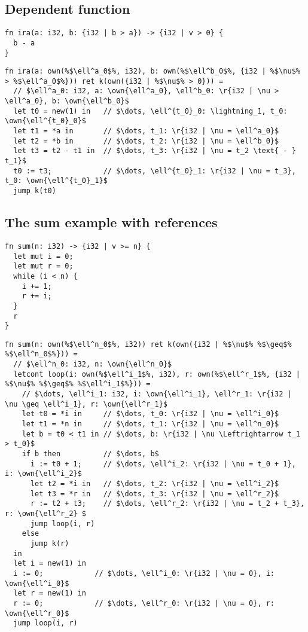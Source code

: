 \documentclass{article}
\newcommand{\own}[1]{\mathbf{own}\left(#1\right)}
\begin{document}
\clearpage
\subsection{Dependent function}
\begin{verbatim}
fn ira(a: i32, b: {i32 | b > a}) -> {i32 | v > 0} {
  b - a
}
\end{verbatim}

\begin{verbatim}
fn ira(a: own(%$\ell^a_0$%, i32), b: own(%$\ell^b_0$%, {i32 | %$\nu$% > %$\ell^a_0$%})) ret k(own({i32 | %$\nu$% > 0})) =
  // $\ell^a_0: i32, a: \own{\ell^a_0}, \ell^b_0: \r{i32 | \nu > \ell^a_0}, b: \own{\ell^b_0}$
  let t0 = new(1) in   // $\dots, \ell^{t_0}_0: \lightning_1, t_0: \own{\ell^{t_0}_0}$
  let t1 = *a in       // $\dots, t_1: \r{i32 | \nu = \ell^a_0}$
  let t2 = *b in       // $\dots, t_2: \r{i32 | \nu = \ell^b_0}$
  let t3 = t2 - t1 in  // $\dots, t_3: \r{i32 | \nu = t_2 \text{ - } t_1}$
  t0 := t3;            // $\dots, \ell^{t_0}_1: \r{i32 | \nu = t_3}, t_0: \own{\ell^{t_0}_1}$
  jump k(t0)
\end{verbatim}

\subsection{The sum example with references}
\begin{verbatim}
fn sum(n: i32) -> {i32 | v >= n} {
  let mut i = 0;
  let mut r = 0;
  while (i < n) {
    i += 1;
    r += i;
  }
  r
}
\end{verbatim}

\begin{verbatim}
fn sum(n: own(%$\ell^n_0$%, i32)) ret k(own({i32 | %$\nu$% %$\geq$% %$\ell^n_0$%})) =
  // $\ell^n_0: i32, n: \own{\ell^n_0}$
  letcont loop(i: own(%$\ell^i_1$%, i32), r: own(%$\ell^r_1$%, {i32 | %$\nu$% %$\geq$% %$\ell^i_1$%})) =
    // $\dots, \ell^i_1: i32, i: \own{\ell^i_1}, \ell^r_1: \r{i32 | \nu \geq \ell^i_1}, r: \own{\ell^r_1}$
    let t0 = *i in     // $\dots, t_0: \r{i32 | \nu = \ell^i_0}$
    let t1 = *n in     // $\dots, t_1: \r{i32 | \nu = \ell^n_0}$
    let b = t0 < t1 in // $\dots, b: \r{i32 | \nu \Leftrightarrow t_1 > t_0}$
    if b then          // $\dots, b$
      i := t0 + 1;     // $\dots, \ell^i_2: \r{i32 | \nu = t_0 + 1}, i: \own{\ell^i_2}$
      let t2 = *i in   // $\dots, t_2: \r{i32 | \nu = \ell^i_2}$
      let t3 = *r in   // $\dots, t_3: \r{i32 | \nu = \ell^r_2}$
      r := t2 + t3;    // $\dots, \ell^r_2: \r{i32 | \nu = t_2 + t_3}, r: \own{\ell^r_2} $
      jump loop(i, r)
    else
      jump k(r)
  in
  let i = new(1) in
  i := 0;            // $\dots, \ell^i_0: \r{i32 | \nu = 0}, i: \own{\ell^i_0}$
  let r = new(1) in
  r := 0;            // $\dots, \ell^r_0: \r{i32 | \nu = 0}, r: \own{\ell^r_0}$
  jump loop(i, r)
\end{verbatim}
\end{document}
